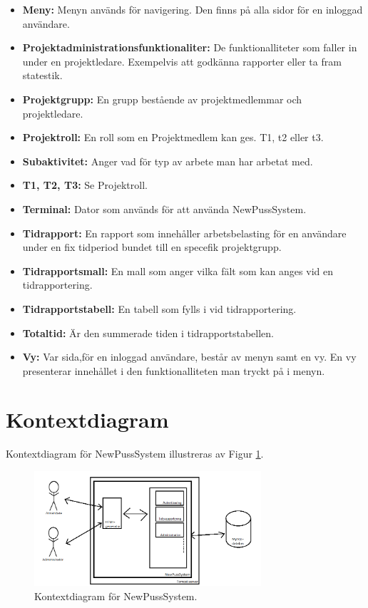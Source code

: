 \documentclass[a4paper]{article}
\begin{document}
\begin{itemize}
\item [] \textbf{Meny:} Menyn används för navigering. Den finns på alla sidor för en inloggad användare.
\item [] \textbf{Projektadministrationsfunktionaliter:} De funktionalliteter som faller in under en projektledare. Exempelvis att godkänna rapporter eller ta fram statestik.
\item [] \textbf{Projektgrupp:} En grupp bestående av projektmedlemmar och projektledare.
\item [] \textbf{Projektroll:} En roll som en Projektmedlem kan ges. T1, t2 eller t3.
\item [] \textbf{Subaktivitet:} Anger vad för typ av arbete man har arbetat med.
\item [] \textbf{T1, T2, T3:} Se Projektroll.
\item [] \textbf{Terminal:} Dator som används för att använda NewPussSystem.
\item [] \textbf{Tidrapport:} En rapport som innehåller arbetsbelasting för en användare under en fix tidperiod bundet till en specefik projektgrupp.
\item [] \textbf{Tidrapportsmall:} En mall som anger vilka fält som kan anges vid en tidrapportering.
\item [] \textbf{Tidrapportstabell:} En tabell som fylls i vid tidrapportering. 
\item [] \textbf{Totaltid:} Är den summerade tiden i tidrapportstabellen. 
\item [] \textbf{Vy:} Var sida,för en inloggad användare, består av menyn samt en vy. En vy presenterar innehållet i den funktionalliteten man tryckt på i menyn.
\end{itemize}
\section{Kontextdiagram}
Kontextdiagram för NewPussSystem illustreras av Figur \ref{image_kontext}.

\begin{figure}[h!]
  \centering
    \includegraphics[width=0.75\textwidth]{context}
   \caption{Kontextdiagram för NewPussSystem.}
   \label{image_kontext}
\end{figure}
\end{document}
